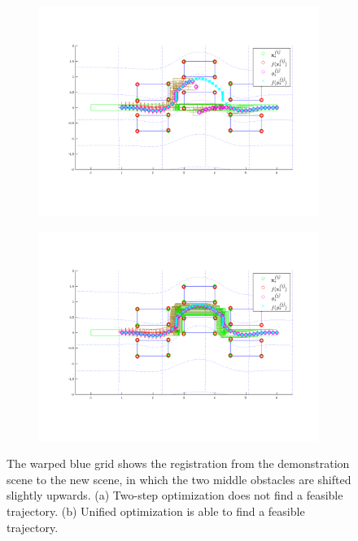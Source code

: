 \documentclass{article}
\begin{document}
\begin{figure}[h!]
\begin{subfigure}[b]{0.5\textwidth}
\includegraphics[width=\textwidth]{scopey_2step}
\vspace{-1.5cm}
\caption{}
\end{subfigure}
\begin{subfigure}[b]{0.5\textwidth}
\includegraphics[width=\textwidth]{scopey_unified}
\vspace{-1.5cm}
\caption{}
\end{subfigure}
\caption{The warped blue grid shows the registration from the demonstration scene to the new scene, in which the two middle obstacles are shifted slightly upwards. (a) Two-step optimization does not find a feasible trajectory. (b) Unified optimization is able to find a feasible trajectory.}
\label{fig:scopey_results}
\end{figure}
\end{document}
